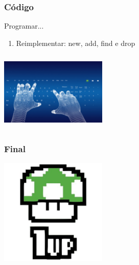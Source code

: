 \documentclass{beamer}
\begin{document}
\begin{frame}
  \frametitle{Código}
  Programar...
  \begin{enumerate}
   \item Reimplementar: new, add, find e drop
  \end{enumerate}

  \begin{center}
    \includegraphics[height = 1.5in, width = 2in]{image/programming.jpg}
  \end{center}
\end{frame}

\begin{frame}
 \frametitle{Final}
 
 \begin{center}
    \includegraphics[height = 2in, width = 2in]{image/levelup2.jpg}
  \end{center}

\end{frame}
\end{document}
